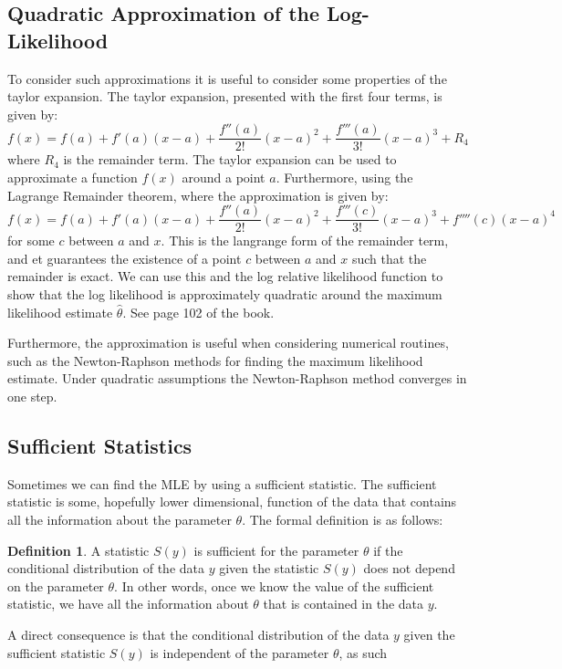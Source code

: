 \documentclass{article}
\theoremstyle{definition}
\newtheorem{definition}[theorem]{Definition}
\theoremstyle{remark}
\begin{document}
\subsection{Quadratic Approximation of the Log-Likelihood}
To consider such approximations it is useful to consider some properties of the taylor expansion. The taylor expansion, presented with the first four terms, is given by:
\begin{equation}
f(x) = f(a) + f'(a)(x-a) + \dfrac{f''(a)}{2!}(x-a)^2 + \dfrac{f'''(a)}{3!}(x-a)^3 + R_4
\end{equation}
where $R_4$ is the remainder term. The taylor expansion can be used to approximate a function $f(x)$ around a point $a$. Furthermore, using the Lagrange Remainder theorem, where the approximation is given by:
\begin{equation}
f(x) = f(a) + f'(a)(x-a) + \dfrac{f''(a)}{2!}(x-a)^2 + \dfrac{f'''(c)}{3!}(x-a)^3 + f''''(c)(x-a)^4
\end{equation}
for some $c$ between $a$ and $x$. This is the langrange form of the remainder term, and et guarantees the existence of a point $c$ between $a$ and $x$ such that the remainder is exact. We can use this and the log relative likelihood function to show that the log likelihood is approximately quadratic around the maximum likelihood estimate $\hat{\theta}$. See page 102 of the book.\vspace{1em}

Furthermore, the approximation is useful when considering numerical routines, such as the Newton-Raphson methods for finding the maximum likelihood estimate. Under quadratic assumptions the Newton-Raphson method converges in one step.


\subsection{Sufficient Statistics}
Sometimes we can find the MLE by using a sufficient statistic. The sufficient statistic is some, hopefully lower dimensional, function of the data that contains all the information about the parameter $\theta$. The formal definition is as follows:
\begin{definition}
A statistic $S(y)$ is sufficient for the parameter $\theta$ if the conditional distribution of the data $y$ given the statistic $S(y)$ does not depend on the parameter $\theta$. In other words, once we know the value of the sufficient statistic, we have all the information about $\theta$ that is contained in the data $y$.
\end{definition}
A direct consequence is that the conditional distribution of the data $y$ given the sufficient statistic $S(y)$ is independent of the parameter $\theta$, as such
\end{document}
